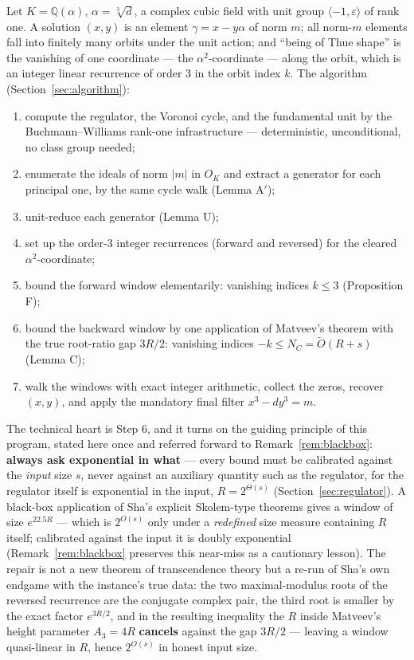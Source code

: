 \documentclass[11pt]{amsart}
\theoremstyle{plain}
\theoremstyle{remark}
\begin{document}
Let $K = \mathbb{Q}(\alpha)$, $\alpha = \sqrt[3]{d}$, a complex cubic
field with unit group $\langle -1, \varepsilon\rangle$ of rank one. A
solution $(x, y)$ is an element $\gamma = x - y\alpha$ of norm $m$; all
norm-$m$ elements fall into finitely many orbits under the unit action;
and ``being of Thue shape'' is the vanishing of one coordinate --- the
$\alpha^2$-coordinate --- along the orbit, which is an integer linear
recurrence of order 3 in the orbit index $k$. The algorithm
(Section~\ref{sec:algorithm}):

\begin{enumerate}
\item compute the regulator, the Voronoi cycle, and the fundamental
  unit by the Buchmann--Williams rank-one infrastructure ---
  deterministic, unconditional, no class group needed;
\item enumerate the ideals of norm $|m|$ in $O_K$ and extract a
  generator for each principal one, by the same cycle walk
  (Lemma A$'$);
\item unit-reduce each generator (Lemma U);
\item set up the order-3 integer recurrences (forward and reversed)
  for the cleared $\alpha^2$-coordinate;
\item bound the forward window elementarily: vanishing indices
  $k \le 3$ (Proposition F);
\item bound the backward window by one application of Matveev's
  theorem with the true root-ratio gap $3R/2$: vanishing indices
  $-k \le N_C = \widetilde{O}(R + s)$ (Lemma C);
\item walk the windows with exact integer arithmetic, collect the
  zeros, recover $(x,y)$, and apply the mandatory final filter
  $x^3 - dy^3 = m$.
\end{enumerate}

The technical heart is Step 6, and it turns on the guiding principle
of this program, stated here once and referred forward to
Remark~\ref{rem:blackbox}: \textbf{always ask exponential in what} ---
every bound must be calibrated against the \emph{input} size $s$,
never against an auxiliary quantity such as the regulator, for the
regulator itself is exponential in the input, $R = 2^{\Theta(s)}$
(Section~\ref{sec:regulator}). A black-box application of Sha's
explicit Skolem-type theorems \cite{Sha19} gives a window of size
$e^{22.5R}$ --- which is $2^{O(s)}$ only under a \emph{redefined} size
measure containing $R$ itself; calibrated against the input it is
doubly exponential (Remark~\ref{rem:blackbox} preserves this near-miss
as a cautionary lesson). The repair is not a
new theorem of transcendence theory but a re-run of Sha's own endgame
with the instance's true data: the two maximal-modulus roots of the
reversed recurrence are the conjugate complex pair, the third root is
smaller by the exact factor $e^{3R/2}$, and in the resulting
inequality the $R$ inside Matveev's height parameter $A_3 = 4R$
\textbf{cancels} against the gap $3R/2$ --- leaving a window
quasi-linear in $R$, hence $2^{O(s)}$ in honest input size.
\end{document}
